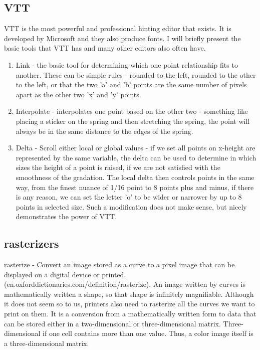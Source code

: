\documentclass[a4paper]{article}
\begin{document}
\subsection{VTT}
VTT is the most powerful and professional hinting editor that exists. It is developed by Microsoft and they also produce fonts. I will briefly present the basic tools that VTT  has and many other editors also often have.
\begin{enumerate}
\item Link - the basic tool for determining which one point relationship fits to another. These can be simple rules - rounded to the left, rounded to the other to the left, or that the two 'a' and 'b' points are the same number of pixels apart as the other two 'x' and 'y' points.

\item Interpolate - interpolates one point based on the other two - something like placing a sticker on the spring and then stretching the spring, the point will always be in the same distance to the edges of the spring.

\item Delta - Scroll either local or global values  - if we set all points on x-height  are represented by the same variable, the delta can be used to determine in which sizes the height of a point is raised, if we are not satisfied with the smoothness of the gradation. The local delta then controls points in the same way, from the finest nuance of 1/16 point to 8 points plus and minus, if there is any reason, we can set the letter 'o' to be wider or narrower by up to 8 points in selected size. Such a modification does not make sense, but nicely demonstrates the power of VTT.

\end{enumerate}

\subsection{rasterizers}

rasterize - Convert an image stored as a curve to a pixel image that can be displayed on a digital device or printed. (en.oxforddictionaries.com/definition/rasterize). An image written by curves is mathematically written a shape, so that shape is infinitely magnifiable. Although it does not seem so to us, printers also need to rasterize all the curves we want to print on them. It is a conversion from a mathematically written form to data that can be stored either in a two-dimensional or three-dimensional matrix. Three-dimensional if one cell contains more than one value. Thus, a color image itself is a three-dimensional matrix.
\end{document}
